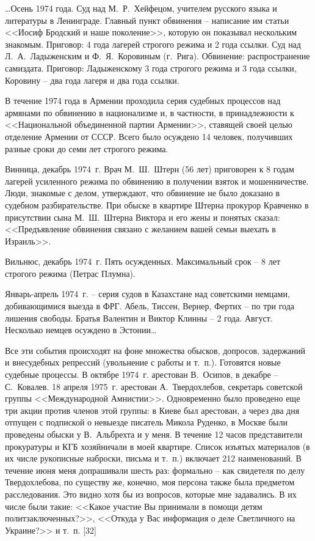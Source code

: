 \documentclass{book}
\begin{document}
\ldots Осень 1974 года. Суд над М.~Р.~Хейфецом, учителем русского языка и литературы в Ленинграде. Главный пункт обвинения -- написание им статьи <<Иосиф Бродский и наше поколение>>, которую он показывал нескольким знакомым. Приговор: 4 года лагерей строгого режима и 2 года ссылки. Суд над Л.~А.~Ладыженским и Ф.~Я.~Коровиным (г.~Рига). Обвинение: распространение самиздата. Приговор: Ладыженскому 3 года строгого режима и 3 года ссылки, Коровину -- два года лагеря и два года ссылки.

В течение 1974 года в Армении проходила серия судебных процессов над армянами по обвинению в национализме и, в частности, в принадлежности к <<Национальной объединенной партии Армении>>, ставящей своей целью отделение Армении от СССР. Всего было осуждено 14 человек, получивших разные сроки до семи лет строгого режима.

Винница, декабрь 1974~г. Врач М.~Ш.~Штерн (56 лет) приговорен к 8 годам лагерей усиленного режима по обвинению в получении взяток и мошенничестве. Люди, знакомые с делом, утверждают, что обвинение не было доказано в судебном разбирательстве. При обыске в квартире Штерна прокурор Кравченко в присутствии сына М.~Ш.~Штерна Виктора и его жены и понятых сказал: <<Предъявление обвинения связано с желанием вашей семьи выехать в Израиль>>.

Вильнюс, декабрь 1974~г. Пять осужденных. Максимальный срок -- 8 лет строгого режима (Петрас Плумна).

Январь-апрель 1974~г. -- серия судов в Казахстане над советскими немцами, добивающимися выезда в ФРГ. Абель, Тиссен, Вернер, Фертих -- по три года лишения свободы. Братья Валентин и Виктор Клинны -- 2 года. Август. Несколько нем­цев осуждено в Эстонии\ldots

Все эти события происходят на фоне множества обысков, допросов, задержаний и внесудебных репрессий (увольнение с работы и т.~п.). Готовятся новые судебные процессы. В октябре 1974~г. арестован В.~Осипов, в декабре -- С.~Ковалев. 18 апреля 1975~г. арестован А.~Твердохлебов, секретарь советской группы <<Международной Амнистии>>. Одновременно было проведено еще три акции против членов этой группы: в Киеве был арестован, а через два дня отпущен с подпиской о невыезде писатель Микола Руденко, в Москве были проведены обыски у В.~Альбрехта и у меня. В течение 12 часов представители прокуратуры и КГБ хозяйничали в моей квартире. Список изъятых материалов (в их числе рукописные наброски, письма и т.~п.) включает 212 наименований. В течение июня меня допрашивали шесть раз: формально -- как свидетеля по делу Твердохлебова, по существу же, конечно, моя персона также была предметом расследования. Это видно хотя бы из вопросов, которые мне задавались. В их числе были такие: <<Какое участие Вы принимали в помощи детям 
политзаключенных?>>, <<Откуда у Вас информация о деле Светличного на Украине?>> и т.~п. [32]
\end{document}

